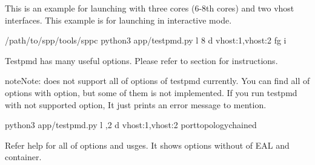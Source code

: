 \documentclass[a4paper,11pt,openany,oneside,english]{sphinxmanual}
\begin{document}
This is an example for launching with three cores (6-8th cores)
and two vhost interfaces.
This example is for launching  in interactive mode.

\begin{sphinxVerbatim}[commandchars=\\\{\},formatcom=\footnotesize]
  /path/to/spp/tools/sppc
 python3 app/testpmd.py \PYGZhy{}l \PYGZhy{}8 \PYGZhy{}d vhost:1,vhost:2 \PYGZhy{}fg \PYGZhy{}i
\end{sphinxVerbatim}

Testpmd has many useful options. Please refer to
section for instructions.

\begin{sphinxadmonition}{note}{Note:}
 does not support all of options of testpmd currently.
You can find all of options with  option, but some of them
is not implemented. If you run testpmd with not supported option,
It just prints an error message to mention.

\begin{sphinxVerbatim}[commandchars=\\\{\},formatcom=\footnotesize]
 python3 app/testpmd.py \PYGZhy{}l ,2 \PYGZhy{}d vhost:1,vhost:2 
  \PYGZhy{}\PYGZhy{}port\PYGZhy{}topologychained
\end{sphinxVerbatim}
\end{sphinxadmonition}

Refer help for all of options and usges.
It shows options without of EAL and container.
\end{document}
